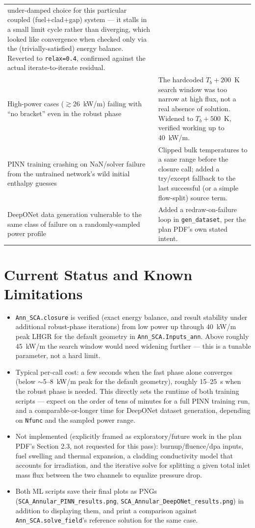 \documentclass[11pt]{article}
\begin{document}
\begin{longtable}{@{}p{}p{}@{}}
under-damped choice for this particular coupled (fuel+clad+gap) system ---
it stalls in a small limit cycle rather than diverging, which looked like
convergence when checked only via the (trivially-satisfied) energy
balance. Reverted to \texttt{relax=0.4}, confirmed against the actual
iterate-to-iterate residual. \\
High-power cases ($\gtrsim$26~kW/m) failing with ``no bracket'' even in the
robust phase & The hardcoded $T_b+200$~K search window was too narrow at
high flux, not a real absence of solution. Widened to $T_b+500$~K,
verified working up to 40~kW/m. \\
PINN training crashing on NaN/solver failure from the untrained network's
wild initial enthalpy guesses & Clipped bulk temperatures to a sane range
before the closure call; added a try/except fallback to the last
successful (or a simple flow-split) source term. \\
DeepONet data generation vulnerable to the same class of failure on a
randomly-sampled power profile & Added a redraw-on-failure loop in
\texttt{gen\_dataset}, per the plan PDF's own stated intent. \\
\bottomrule
\end{longtable}

\section{Current Status and Known Limitations}
\label{sec:status}

\begin{itemize}
\item \texttt{Ann\_SCA.closure} is verified (exact energy balance, and
result stability under additional robust-phase iterations) from low power
up through 40~kW/m peak LHGR for the default geometry in
\texttt{Ann\_SCA.Inputs\_ann}. Above roughly 45~kW/m the search window
would need widening further --- this is a tunable parameter, not a hard
limit.
\item Typical per-call cost: a few seconds when the fast phase alone
converges (below $\sim$5--8~kW/m peak for the default geometry), roughly
15--25~s when the robust phase is needed. This directly sets the runtime
of both training scripts --- expect on the order of tens of minutes for a
full PINN training run, and a comparable-or-longer time for DeepONet
dataset generation, depending on \texttt{Nfunc} and the sampled power
range.
\item Not implemented (explicitly framed as exploratory/future work in the
plan PDF's Section 2.3, not requested for this pass): burnup/fluence/dpa
inputs, fuel swelling and thermal expansion, a cladding conductivity model
that accounts for irradiation, and the iterative solve for splitting a
given total inlet mass flux between the two channels to equalize pressure
drop.
\item Both ML scripts save their final plots as PNGs
(\texttt{SCA\_Annular\_PINN\_results.png},
\texttt{SCA\_Annular\_DeepONet\_results.png}) in addition to displaying
them, and print a comparison against \texttt{Ann\_SCA.solve\_field}'s
reference solution for the same case.
\end{itemize}
\end{document}
